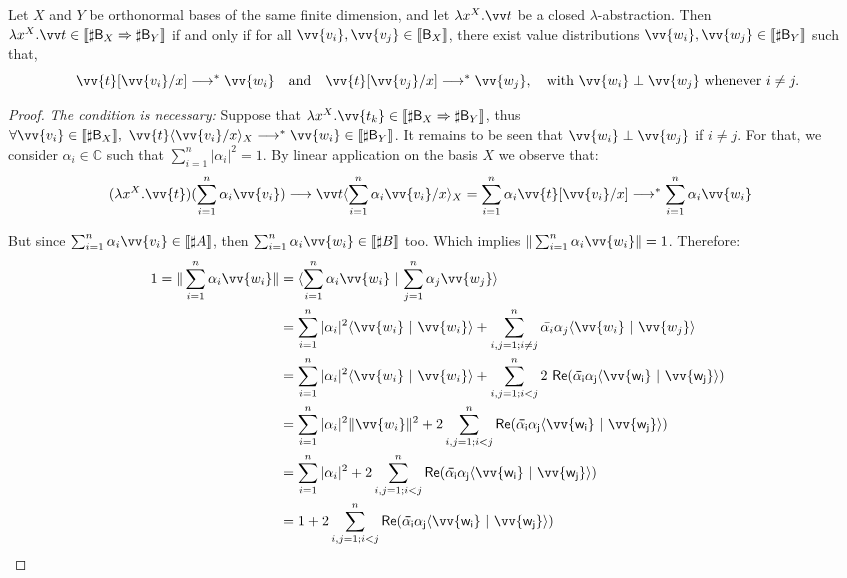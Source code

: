\documentclass[runningheads,orivec,envcountsame,envcountsect]{llncs}
\newcommand\Rpart[1]{\mathsf{Re(#1)}}
\newcommand\lra{\longrightarrow}
\newcommand\ansubst[2]{\ensuremath{\langle #1 \rangle_{#2}}}
\def\C{\mathbb{C}}            %
\def\scal#1#2{\langle{#1}~|~{#2}\rangle}
\def\Lam#1#2#3{\lambda#1^{#2}{.}#3} %
\def\eval{\lra^*}
\def\Arr{\Rightarrow}
\def\sem#1{\llbracket#1\rrbracket}
\newcommand\basis[1]{\ensuremath{\mathsf{B}_{#1}}}
\begin{document}
\begin{restatelemma}
  Let $X$ and $Y$ be orthonormal bases of the same finite
  dimension, and let $\Lam{x}{X}{\vv t}$ be a closed $\lambda$-abstraction.
  Then $\Lam{x}{X}{\vv t}\in\sem{\sharp\basis{X}\Arr\sharp\basis{Y}}$
  if and only if 
  for all $\vv{v_i},\vv{v_j}\in\sem{\basis{X}}$,
  there exist value distributions
  $\vv{w_i},\vv{w_j}\in\sem{\sharp\basis{Y}}$ such that,
  \[
    \vv{t}[\vv{v_i}/x]\eval\vv{w_i}
    \quad\text{and}\quad
    \vv{t}[\vv{v_j}/x]\eval\vv{w_j},
    \quad\text{with } 
    \vv{w_i}\perp\vv{w_j}\text{ whenever }i\neq j.
  \]
\end{restatelemma}
\begin{proof}
  \textit{The condition is necessary:} Suppose that $\Lam{x}{X}{\vv{t_k}}\in\sem{\sharp\basis{X}\Arr\sharp\basis{Y}}$, thus $\forall \vv{v_i}\in\sem{\sharp\basis{X}},\ \vv{t}\ansubst{\vv{v_i}/x}{X}\eval\vv{w_i}\in\sem{\sharp\basis{Y}}$. It remains to be seen that $\vv{w_i} \perp \vv{w_j}$ if $i\neq j$. For that, we consider $\alpha_i\in\C$ such that $\sum_{i=1}^n |\alpha_i|^2 = 1$. By linear application on the basis $X$ we observe that:
  \begin{align*}
    (\Lam{x}{X}{\vv{t}})(\sum_{i=1}^n \alpha_i \vv{v_i}) &\lra \vv t\ansubst{\sum_{i=1}^n \alpha_i \vv{v_i}/x}{X}
    = \sum_{i=1}^{n} \alpha_i \vv{t}[\vv{v_i}/x] 
    \eval \sum_{i=1}^n \alpha_i \vv{w_i}
  \end{align*}

  But since $\sum_{i=1}^n \alpha_i \vv{v_i}\in\sem{\sharp A}$, then $\sum_{i=1}^n \alpha_i \vv{w_i}\in\sem{\sharp B}$ too. Which implies $\|\sum_{i=1}^n \alpha_i \vv{w_i}\|=1$. Therefore:
  \begin{align*}
    1 = \|\sum_{i=1}^n \alpha_i \vv{w_i}\| &= \scal{\sum_{i=1}^n \alpha_i \vv{w_i}}{\sum_{j=1}^n \alpha_j \vv{w_j}}\\
    &=\sum_{i=1}^n |\alpha_i|^2 \scal{\vv{w_i}}{\vv{w_i} } + \sum_{i,j=1; i\neq j}^n \bar{\alpha_i}\alpha_j \scal{\vv{w_i}}{\vv{w_j}}\\
    &=\sum_{i=1}^n |\alpha_i|^2 \scal{\vv{w_i}}{\vv{w_i} } + \sum_{i,j=1; i<j}^n 2~\Rpart{\bar{\alpha_i}\alpha_j \scal{\vv{w_i}}{\vv{w_j}}}\\
    &=\sum_{i=1}^n |\alpha_i|^2 \|\vv{w_i}\|^2 + 2\sum_{i,j=1; i<j}^n \Rpart{\bar{\alpha_i}\alpha_j \scal{\vv{w_i}}{\vv{w_j}}}\\
    &=\sum_{i=1}^n |\alpha_i|^2 + 2\sum_{i,j=1; i<j}^n\Rpart{\bar{\alpha_i}\alpha_j \scal{\vv{w_i}}{\vv{w_j}}}\\
    &= 1 + 2\sum_{i,j=1; i<j}^n \Rpart{\bar{\alpha_i}\alpha_j \scal{\vv{w_i}}{\vv{w_j}}}
  \end{align*}


\end{proof}
\end{document}
